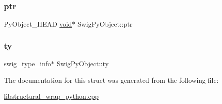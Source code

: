 \mbox{\label{struct_swig_py_object_a41b1d569a8ba4fa9b1d87579c144891b}} 
\subsubsection{\texorpdfstring{ptr}{ptr}}
{\footnotesize\ttfamily Py\+Object\+\_\+\+H\+E\+AD \hyperlink{lp__lib_8h_ac7828c7b2b31d2e11af17bdb6289c5d9}{void}$\ast$ Swig\+Py\+Object\+::ptr}

\mbox{\label{struct_swig_py_object_a510b5a6f66a8a33c0a54c3eeb83e5ba5}} 
\subsubsection{\texorpdfstring{ty}{ty}}
{\footnotesize\ttfamily \hyperlink{structswig__type__info}{swig\+\_\+type\+\_\+info}$\ast$ Swig\+Py\+Object\+::ty}



The documentation for this struct was generated from the following file\+:\begin{DoxyCompactItemize}
\item 
\hyperlink{libstructural__wrap__python_8cpp}{libstructural\+\_\+wrap\+\_\+python.\+cpp}\end{DoxyCompactItemize}
